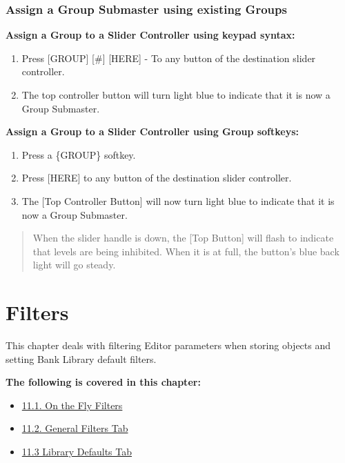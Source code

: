\documentclass[
]{article}
\providecommand{\tightlist}{%
  \setlength{\itemsep}{0pt}\setlength{\parskip}{0pt}}
\begin{document}
\hypertarget{assign-a-group-submaster-using-existing-groups}{%
\subsubsection{Assign a Group Submaster using existing Groups}\label{assign-a-group-submaster-using-existing-groups}}

\textbf{Assign a Group to a Slider Controller using keypad syntax:}

\begin{enumerate}
\def\labelenumi{\arabic{enumi}.}
\item
  Press {[}GROUP{]} {[}\#{]} {[}HERE{]} - To any button of the destination slider controller.
\item
  The top controller button will turn light blue to indicate that it is now a Group Submaster.
\end{enumerate}

\textbf{Assign a Group to a Slider Controller using Group softkeys:}

\begin{enumerate}
\def\labelenumi{\arabic{enumi}.}
\item
  Press a \{GROUP\} softkey.
\item
  Press {[}HERE{]} to any button of the destination slider controller.
\item
  The {[}Top Controller Button{]} will now turn light blue to indicate that it is now a Group Submaster.
\end{enumerate}

\begin{quote}
{When the slider handle is down, the {[}Top Button{]} will flash to indicate that levels are being inhibited. When it is at full, the button's blue back light will go steady.}
\end{quote}

\hypertarget{filters}{%
\section{Filters}\label{filters}}

This chapter deals with filtering Editor parameters when storing objects and setting Bank Library default filters.

\textbf{The following is covered in this chapter:}

\begin{itemize}
\tightlist
\item
  \href{https://vibemanual.compulite.com/filters.html\#on-the-fly-filters}{11.1. On the Fly Filters}
\item
  \href{https://vibemanual.compulite.com/filters.html\#general-filters-tab}{11.2. General Filters Tab}
\item
  \href{https://vibemanual.compulite.com/filters.html\#library-defaults-tab}{11.3 Library Defaults Tab}
\end{itemize}
\end{document}
